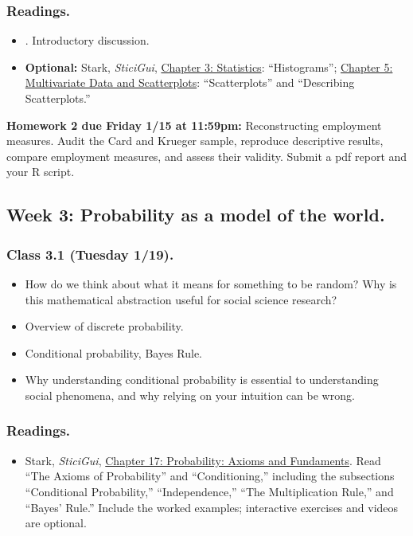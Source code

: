 \documentclass[letterpaper, 12pt, parskip=full,DIV=10]{scrartcl}
\begin{document}
\subsubsection*{Readings.}
\begin{itemize}
\item {}. Introductory discussion.
\item \textbf{Optional:} Stark, \textit{SticiGui}, \href{https://www.stat.berkeley.edu/~stark/SticiGui/Text/histograms.htm}{Chapter 3: Statistics}: ``Histograms''; \href{https://www.stat.berkeley.edu/~stark/SticiGui/Text/scatterplots.htm}{Chapter 5: Multivariate Data and Scatterplots}: ``Scatterplots'' and ``Describing Scatterplots.''
\end{itemize}

\textbf{Homework 2 due Friday 1/15 at 11:59pm:}
Reconstructing employment measures. Audit the Card and Krueger sample, reproduce descriptive results, compare employment measures, and assess their validity. Submit a pdf report and your R script.

\subsection*{Week 3: Probability as a model of the world.}
\subsubsection*{Class 3.1 (Tuesday 1/19).}
\begin{itemize}
\item How do we think about what it means for something to be random? Why is this mathematical abstraction useful for social science research?
\item Overview of discrete probability.
\item Conditional probability, Bayes Rule.
\item Why understanding conditional probability is essential to understanding social phenomena, and why relying on your intuition can be wrong.
\end{itemize}

\subsubsection*{Readings.}
\begin{itemize}
\item Stark, \textit{SticiGui}, \href{https://www.stat.berkeley.edu/~stark/SticiGui/Text/probabilityAxioms.htm}{Chapter 17: Probability: Axioms and Fundaments}. Read ``The Axioms of Probability'' and ``Conditioning,'' including the subsections ``Conditional Probability,'' ``Independence,'' ``The Multiplication Rule,'' and ``Bayes' Rule.'' Include the worked examples; interactive exercises and videos are optional.
\end{itemize}
\end{document}
